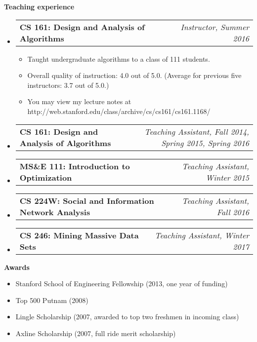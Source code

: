 \documentclass[letterpaper,10pt]{article}
\makeatletter
\newcommand{\resheading}[1]{{\large \colorbox{mygrey}{\begin{minipage}{\textwidth}{\textbf{#1 \vphantom{p\^{E}}}}\end{minipage}}}}
\newcommand{\ressubheading}[4]{
\begin{tabular*}{7.0in}{l@{\extracolsep{\fill}}r}
		\textbf{#1} & \textit{#4} \\
\end{tabular*}\vspace{-6pt}}
\makeatother
\begin{document}
\resheading{Teaching experience}
\begin{itemize}
\item
	\ressubheading{CS 161: Design and Analysis of Algorithms}{Stanford, CA}{Instructor}{Instructor, Summer 2016}
	\begin{itemize}
	\item Taught undergraduate algorithms to a class of 111 students.
	\item Overall quality of instruction: 4.0 out of 5.0.  (Average for previous five instructors: 3.7 out of 5.0.)
	\item You may view my lecture notes at http://web.stanford.edu/class/archive/cs/cs161/cs161.1168/
	\end{itemize}
\item
	\ressubheading{CS 161: Design and Analysis of Algorithms}{Stanford, CA}{Teaching Assistant}{Teaching Assistant, Fall 2014, Spring 2015, Spring 2016}
\item
	\ressubheading{MS\&E 111: Introduction to Optimization}{Stanford, CA}{Teaching Assistant}{Teaching Assistant, Winter 2015}
\item
	\ressubheading{CS 224W: Social and Information Network Analysis}{Stanford, CA}{Teaching Assistant}{Teaching Assistant, Fall 2016}
\item
	\ressubheading{CS 246: Mining Massive Data Sets}{Stanford, CA}{Teaching Assistant}{Teaching Assistant, Winter 2017}
\end{itemize}

\resheading{Awards}
\begin{itemize}
	\item Stanford School of Engineering Fellowship (2013, one year of funding)
	\item Top 500 Putnam (2008)
	\item Lingle Scholarship (2007, awarded to top two freshmen in incoming class)
	\item Axline Scholarship (2007, full ride merit scholarship)
\end{itemize}
\end{document}
